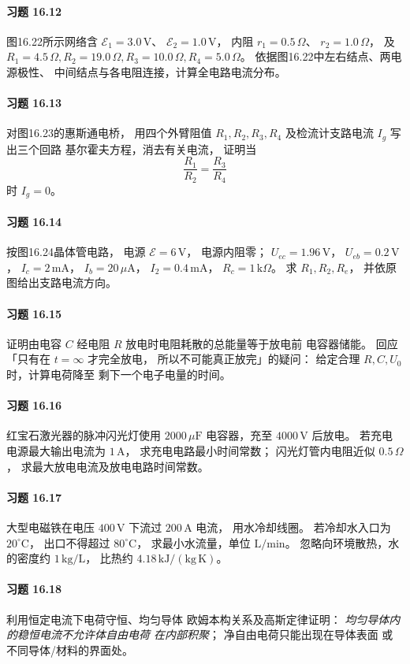\paragraph{习题 16.12}
图16.22所示网络含
\(\mathcal E_1=3.0\,\mathrm V\)、
\(\mathcal E_2=1.0\,\mathrm V\)，
内阻 \(r_1=0.5\,\Omega\)、
\(r_2=1.0\,\Omega\)，
及 \(R_1=4.5\,\Omega,R_2=19.0\,\Omega,
 R_3=10.0\,\Omega,R_4=5.0\,\Omega\)。
依据图16.22中左右结点、两电源极性、
中间结点与各电阻连接，计算全电路电流分布。

\paragraph{习题 16.13}
对图16.23的惠斯通电桥，
用四个外臂阻值 \(R_1,R_2,R_3,R_4\)
及检流计支路电流 \(I_g\) 写出三个回路
基尔霍夫方程，消去有关电流，
证明当
\[
 \frac{R_1}{R_2}=\frac{R_3}{R_4}
\]
时 \(I_g=0\)。

\paragraph{习题 16.14}
按图16.24晶体管电路，
电源 \(\mathcal E=6\,\mathrm V\)，
电源内阻零；
\(U_{ec}=1.96\,\mathrm V\)，
\(U_{eb}=0.2\,\mathrm V\)，
\(I_c=2\,\mathrm{mA}\)，
\(I_b=20\,\mu\mathrm A\)，
\(I_2=0.4\,\mathrm{mA}\)，
\(R_c=1\,\mathrm{k}\Omega\)。
求 \(R_1,R_2,R_e\)，
并依原图给出支路电流方向。

\paragraph{习题 16.15}
证明由电容 \(C\) 经电阻 \(R\)
放电时电阻耗散的总能量等于放电前
电容器储能。
回应「只有在 \(t=\infty\) 才完全放电，
所以不可能真正放完」的疑问：
给定合理 \(R,C,U_0\) 时，计算电荷降至
剩下一个电子电量的时间。

\paragraph{习题 16.16}
红宝石激光器的脉冲闪光灯使用
\(2000\,\mu\mathrm F\) 电容器，充至
\(4000\,\mathrm V\) 后放电。
若充电电源最大输出电流为 \(1\,\mathrm A\)，
求充电电路最小时间常数；
闪光灯管内电阻近似
\(0.5\,\Omega\)，
求最大放电电流及放电电路时间常数。

\paragraph{习题 16.17}
大型电磁铁在电压 \(400\,\mathrm V\)
下流过 \(200\,\mathrm A\) 电流，
用水冷却线圈。
若冷却水入口为 \(20^\circ\mathrm C\)，
出口不得超过 \(80^\circ\mathrm C\)，
求最小水流量，单位
\(\mathrm{L/min}\)。
忽略向环境散热，水的密度约
\(1\,\mathrm{kg/L}\)，
比热约 \(4.18\,\mathrm{kJ/(kg\,K)}\)。

\paragraph{习题 16.18}
利用恒定电流下电荷守恒、均匀导体
欧姆本构关系及高斯定律证明：
\emph{均匀导体内的稳恒电流不允许体自由电荷
在内部积聚}；
净自由电荷只能出现在导体表面
或不同导体/材料的界面处。
